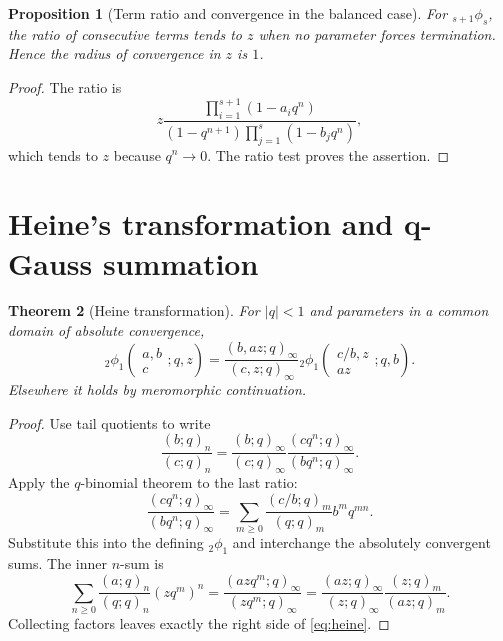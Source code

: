 \documentclass[11pt]{article}
\numberwithin{equation}{section}
\newtheorem{theorem}{Theorem}[section]
\newtheorem{proposition}[theorem]{Proposition}
\theoremstyle{definition}
\begin{document}
\begin{proposition}[Term ratio and convergence in the balanced case]
For ${}_{s+1}\phi_s$, the ratio of consecutive terms tends to $z$ when no parameter forces termination.  Hence the radius of convergence in $z$ is $1$.
\end{proposition}
\begin{proof}
The ratio is
\[
z\frac{\prod_{i=1}^{s+1}(1-a_iq^n)}{(1-q^{n+1})\prod_{j=1}^{s}(1-b_jq^n)},
\]
which tends to $z$ because $q^n\to0$.  The ratio test proves the assertion.
\end{proof}

\section{Heine's transformation and q-Gauss summation}
\begin{theorem}[Heine transformation]
For $|q|<1$ and parameters in a common domain of absolute convergence,
\begin{equation}
{}_2\phi_1\!\left(\begin{matrix}a,b\\c\end{matrix};q,z\right)
=\frac{(b,az;q)_\infty}{(c,z;q)_\infty}
{}_2\phi_1\!\left(\begin{matrix}c/b,z\\az\end{matrix};q,b\right).
\label{eq:heine}
\end{equation}
Elsewhere it holds by meromorphic continuation.
\end{theorem}
\begin{proof}
Use tail quotients to write
\[
\frac{(b;q)_n}{(c;q)_n}
=\frac{(b;q)_\infty}{(c;q)_\infty}
\frac{(cq^n;q)_\infty}{(bq^n;q)_\infty}.
\]
Apply the $q$-binomial theorem to the last ratio:
\[
\frac{(cq^n;q)_\infty}{(bq^n;q)_\infty}
=\sum_{m\ge0}\frac{(c/b;q)_m}{(q;q)_m}b^mq^{mn}.
\]
Substitute this into the defining ${}_2\phi_1$ and interchange the absolutely convergent sums.  The inner $n$-sum is
\[
\sum_{n\ge0}\frac{(a;q)_n}{(q;q)_n}(zq^m)^n
=\frac{(azq^m;q)_\infty}{(zq^m;q)_\infty}
=\frac{(az;q)_\infty}{(z;q)_\infty}
\frac{(z;q)_m}{(az;q)_m}.
\]
Collecting factors leaves exactly the right side of \eqref{eq:heine}.
\end{proof}
\end{document}
